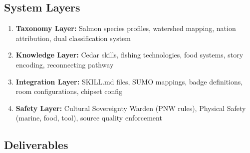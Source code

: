 \documentclass[11pt,letterpaper]{article}
\begin{document}
\subsection{System Layers}

\begin{enumerate}[leftmargin=2em]
\item \textbf{Taxonomy Layer:} Salmon species profiles, watershed mapping, nation attribution, dual classification system
\item \textbf{Knowledge Layer:} Cedar skills, fishing technologies, food systems, story encoding, reconnecting pathway
\item \textbf{Integration Layer:} SKILL.md files, SUMO mappings, badge definitions, room configurations, chipset config
\item \textbf{Safety Layer:} Cultural Sovereignty Warden (PNW rules), Physical Safety (marine, food, tool), source quality enforcement
\end{enumerate}

\subsection{Deliverables}
\end{document}
